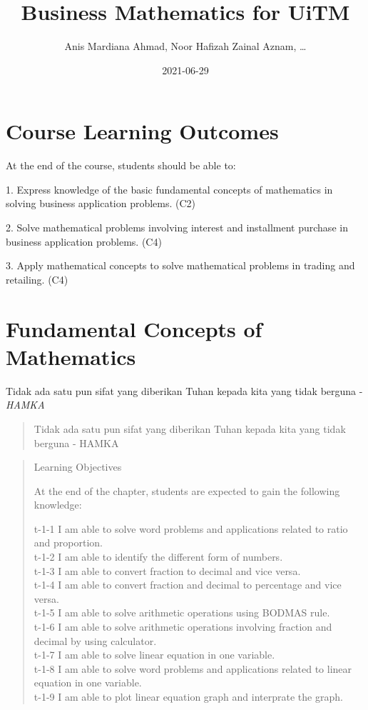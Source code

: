 \documentclass[
]{book}
\title{Business Mathematics for UiTM}
\author{Anis Mardiana Ahmad, Noor Hafizah Zainal Aznam, \ldots{}}
\date{2021-06-29}
\begin{document}
\maketitle

{
\setcounter{tocdepth}{1}
\tableofcontents
}
\hypertarget{course-learning-outcomes}{%
\chapter*{Course Learning Outcomes}\label{course-learning-outcomes}}

At the end of the course, students should be able to:

1. Express knowledge of the basic fundamental concepts of mathematics in solving business application problems. (C2)

2. Solve mathematical problems involving interest and installment purchase in business application problems. (C4)

3. Apply mathematical concepts to solve mathematical problems in trading and retailing. (C4)

\hypertarget{intro}{%
\chapter{Fundamental Concepts of Mathematics}\label{intro}}

\begin{noteblock}
Tidak ada satu pun sifat yang diberikan Tuhan kepada kita yang tidak berguna - \emph{HAMKA}

\end{noteblock}

\begin{quote}
Tidak ada satu pun sifat yang diberikan Tuhan kepada kita yang tidak berguna - HAMKA
\end{quote}

\begin{quote}
Learning Objectives

At the end of the chapter, students are expected to gain the following knowledge:

t-1-1 I am able to solve word problems and applications related to ratio and proportion.\\
t-1-2 I am able to identify the different form of numbers.\\
t-1-3 I am able to convert fraction to decimal and vice versa.\\
t-1-4 I am able to convert fraction and decimal to percentage and vice versa.\\
t-1-5 I am able to solve arithmetic operations using BODMAS rule.\\
t-1-6 I am able to solve arithmetic operations involving fraction and decimal by using calculator.\\
t-1-7 I am able to solve linear equation in one variable.\\
t-1-8 I am able to solve word problems and applications related to linear equation in one variable.\\
t-1-9 I am able to plot linear equation graph and interprate the graph.
\end{quote}
\end{document}
